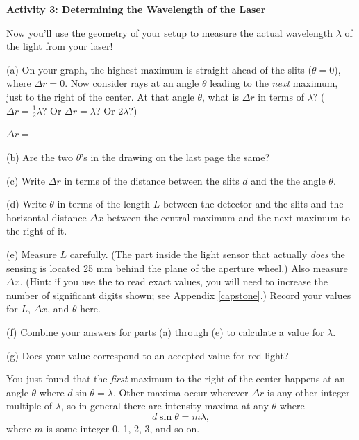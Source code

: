 \pagebreak[2]
\textbf{Activity 3: Determining the Wavelength of the Laser }

Now you'll use the geometry of your setup to measure the actual wavelength $\lambda$ of the light from your laser!

(a) On your graph, the highest maximum is straight ahead of the slits ($\theta=0$), where $\Delta r=0$.  Now consider rays at an angle $\theta$ leading to the \textit{next} maximum, just to the right of the center.  At that angle $\theta$, what is $\Delta r$ in terms of $\lambda$?   ($\Delta r=\frac{1}{2}\lambda$?  Or $\Delta r = \lambda$?  Or $2\lambda$?) 

\vspace{0.1in}
\hspace{0.8in}$\Delta r=$
\vspace{0.1in}

(b) Are the two $\theta$'s in the drawing on the last page the same?
\answerspace{0.2in}

(c) Write $\Delta r$ in terms of the distance between the slits $d$ and the the angle $\theta$.
\answerspace{0.4in}

(d) Write $\theta$ in terms of the length $L$ between the detector and the slits and the horizontal distance $\Delta x$ between the central maximum and the next maximum to the right of it.
\answerspace{0.4in}

(e) Measure $L$ carefully.  (The part inside the light sensor that actually \textit{does} the sensing is located 25 mm behind the plane of the aperture wheel.)  
Also measure $\Delta x$.  (Hint: if you use the  to read exact values, you will need to increase the number of significant digits shown; see Appendix \ref{capstone}.)
Record your values for $L$, $\Delta x$, and $\theta$ here.

\answerspace{0.8in}

(f) Combine your answers for parts (a) through (e) to calculate a value for $\lambda$.  
\answerspace{1in}

(g) Does your value correspond to an accepted value for red light?
\answerspace{0.3in}

You just found that the \textit{first} maximum to the right of the center happens at an angle $\theta$ where $d \sin \theta = \lambda$.  Other maxima occur wherever $\Delta r$ is any other integer multiple of $\lambda$, so in general there are intensity maxima at any $\theta$ where
\begin{displaymath}
d \sin \theta = m \lambda,
\end{displaymath}
where $m$ is some integer 0, 1, 2, 3, and so on.  

